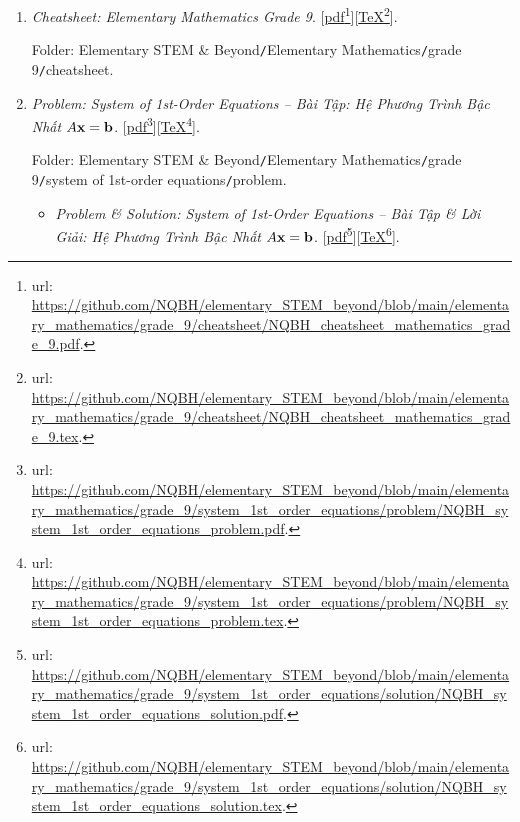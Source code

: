 \documentclass[12pt,twoside]{book}
\begin{document}
\begin{enumerate}
	\item {\it Cheatsheet: Elementary Mathematics Grade 9}. [\href{https://github.com/NQBH/elementary_STEM_beyond/blob/main/elementary_mathematics/grade_9/cheatsheet/NQBH_cheatsheet_mathematics_grade_9.pdf}{pdf}\footnote{{\sc url}: \url{https://github.com/NQBH/elementary_STEM_beyond/blob/main/elementary_mathematics/grade_9/cheatsheet/NQBH_cheatsheet_mathematics_grade_9.pdf}.}][\href{https://github.com/NQBH/elementary_STEM_beyond/blob/main/elementary_mathematics/grade_9/cheatsheet/NQBH_cheatsheet_mathematics_grade_9.tex}{\TeX}\footnote{{\sc url}: \url{https://github.com/NQBH/elementary_STEM_beyond/blob/main/elementary_mathematics/grade_9/cheatsheet/NQBH_cheatsheet_mathematics_grade_9.tex}.}].
	
	Folder: {\sf Elementary STEM \& Beyond{\tt/}Elementary Mathematics{\tt/}grade 9{\tt/}cheatsheet}.
	\item {\it Problem: System of 1st-Order Equations -- Bài Tập: Hệ Phương Trình Bậc Nhất $A{\bf x} = {\bf b}$}. [\href{https://github.com/NQBH/elementary_STEM_beyond/blob/main/elementary_mathematics/grade_9/system_1st_order_equations/problem/NQBH_system_1st_order_equations_problem.pdf}{pdf}\footnote{{\sc url}: \url{https://github.com/NQBH/elementary_STEM_beyond/blob/main/elementary_mathematics/grade_9/system_1st_order_equations/problem/NQBH_system_1st_order_equations_problem.pdf}.}][\href{https://github.com/NQBH/elementary_STEM_beyond/blob/main/elementary_mathematics/grade_9/system_1st_order_equations/problem/NQBH_system_1st_order_equations_problem.tex}{\TeX}\footnote{{\sc url}: \url{https://github.com/NQBH/elementary_STEM_beyond/blob/main/elementary_mathematics/grade_9/system_1st_order_equations/problem/NQBH_system_1st_order_equations_problem.tex}.}].
	
	Folder: {\sf Elementary STEM \& Beyond{\tt/}Elementary Mathematics{\tt/}grade 9{\tt/}system of 1st-order equations{\tt/}problem}.
	\begin{itemize}
		\item {\it Problem \& Solution: System of 1st-Order Equations -- Bài Tập \& Lời Giải: Hệ Phương Trình Bậc Nhất $A{\bf x} = {\bf b}$}. [\href{https://github.com/NQBH/elementary_STEM_beyond/blob/main/elementary_mathematics/grade_9/system_1st_order_equations/solution/NQBH_system_1st_order_equations_solution.pdf}{pdf}\footnote{{\sc url}: \url{https://github.com/NQBH/elementary_STEM_beyond/blob/main/elementary_mathematics/grade_9/system_1st_order_equations/solution/NQBH_system_1st_order_equations_solution.pdf}.}][\href{https://github.com/NQBH/elementary_STEM_beyond/blob/main/elementary_mathematics/grade_9/system_1st_order_equations/solution/NQBH_system_1st_order_equations_solution.tex}{\TeX}\footnote{{\sc url}: \url{https://github.com/NQBH/elementary_STEM_beyond/blob/main/elementary_mathematics/grade_9/system_1st_order_equations/solution/NQBH_system_1st_order_equations_solution.tex}.}].
		

\end{itemize}
\end{enumerate}
\end{document}
